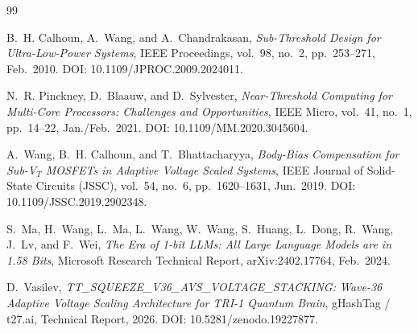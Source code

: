\begin{thebibliography}{99}

B.~H. Calhoun, A.~Wang, and A.~Chandrakasan,
\emph{Sub-Threshold Design for Ultra-Low-Power Systems},
IEEE Proceedings, vol.~98, no.~2, pp.~253--271, Feb.~2010.
DOI: 10.1109/JPROC.2009.2024011.

N.~R. Pinckney, D.~Blaauw, and D.~Sylvester,
\emph{Near-Threshold Computing for Multi-Core Processors: Challenges and Opportunities},
IEEE Micro, vol.~41, no.~1, pp.~14--22, Jan./Feb.~2021.
DOI: 10.1109/MM.2020.3045604.

A.~Wang, B.~H. Calhoun, and T.~Bhattacharyya,
\emph{Body-Bias Compensation for Sub-V$_T$ MOSFETs in Adaptive Voltage Scaled Systems},
IEEE Journal of Solid-State Circuits (JSSC), vol.~54, no.~6, pp.~1620--1631, Jun.~2019.
DOI: 10.1109/JSSC.2019.2902348.

S.~Ma, H.~Wang, L.~Ma, L.~Wang, W.~Wang, S.~Huang, L.~Dong, R.~Wang, J.~Lv, and
F.~Wei,
\emph{The Era of 1-bit LLMs: All Large Language Models are in 1.58 Bits},
Microsoft Research Technical Report, arXiv:2402.17764, Feb.~2024.

D.~Vasilev,
\emph{TT\_SQUEEZE\_V36\_AVS\_VOLTAGE\_STACKING: Wave-36 Adaptive Voltage Scaling
Architecture for TRI-1 Quantum Brain},
gHashTag / t27.ai, Technical Report, 2026.
DOI: 10.5281/zenodo.19227877.

\end{thebibliography}


